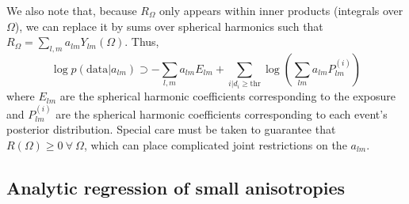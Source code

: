 \documentclass{article}
\begin{document}
We also note that, because $R_\Omega$ only appears within inner products (integrals over $\Omega$), we can replace it by sums over spherical harmonics such that $R_\Omega = \sum\limits_{l,m} a_{lm} Y_{lm}(\Omega)$.
Thus, 
\begin{equation}
    \log p(\mathrm{data}|a_{lm}) \supset - \sum\limits_{l,m} a_{lm} E_{lm} + \sum\limits_{i|d_i\geq\mathrm{thr}} \log\left(\sum\limits_{lm} a_{lm} P_{lm}^{(i)} \right)
\end{equation}
where $E_{lm}$ are the spherical harmonic coefficients corresponding to the exposure and $P_{lm}^{(i)}$ are the spherical harmonic coefficients corresponding to each event's posterior distribution.
Special care must be taken to guarantee that $R(\Omega)\geq0\ \forall\ \Omega$, which can place complicated joint restrictions on the $a_{lm}$.


\subsection*{Analytic regression of small anisotropies}
\end{document}
